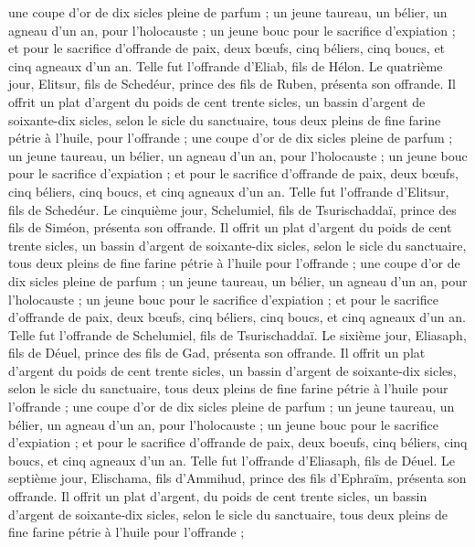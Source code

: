 \begin{multicols}{2}
une coupe d'or de dix sicles pleine de parfum ;
un jeune taureau, un bélier, un agneau d'un an, pour l'holocauste ;
un jeune bouc pour le sacrifice d'expiation ;
et pour le sacrifice d'offrande de paix, deux bœufs, cinq béliers, cinq boucs, et cinq agneaux d'un an. Telle fut l'offrande d'Eliab, fils de Hélon.
Le quatrième jour, Elitsur, fils de Schedéur, prince des fils de Ruben, présenta son offrande.
Il offrit un plat d'argent du poids de cent trente sicles, un bassin d'argent de soixante-dix sicles, selon le sicle du sanctuaire, tous deux pleins de fine farine pétrie à l'huile, pour l'offrande ;
une coupe d'or de dix sicles pleine de parfum ;
un jeune taureau, un bélier, un agneau d'un an, pour l'holocauste ;
un jeune bouc pour le sacrifice d'expiation ;
et pour le sacrifice d'offrande de paix, deux bœufs, cinq béliers, cinq boucs, et cinq agneaux d'un an. Telle fut l'offrande d'Elitsur, fils de Schedéur.
Le cinquième jour, Schelumiel, fils de Tsurischaddaï, prince des fils de Siméon, présenta son offrande.
Il offrit un plat d'argent du poids de cent trente sicles, un bassin d'argent de soixante-dix sicles, selon le sicle du sanctuaire, tous deux pleins de fine farine pétrie à l'huile pour l'offrande ;
une coupe d'or de dix sicles pleine de parfum ;
un jeune taureau, un bélier, un agneau d'un an, pour l'holocauste ;
un jeune bouc pour le sacrifice d'expiation ;
et pour le sacrifice d'offrande de paix, deux bœufs, cinq béliers, cinq boucs, et cinq agneaux d'un an. Telle fut l'offrande de Schelumiel, fils de Tsurischaddaï.
Le sixième jour, Eliasaph, fils de Déuel, prince des fils de Gad, présenta son offrande.
Il offrit un plat d'argent du poids de cent trente sicles, un bassin d'argent de soixante-dix sicles, selon le sicle du sanctuaire, tous deux pleins de fine farine pétrie à l'huile pour l'offrande ;
une coupe d'or de dix sicles pleine de parfum ;
un jeune taureau, un bélier, un agneau d'un an, pour l'holocauste ;
un jeune bouc pour le sacrifice d'expiation ;
et pour le sacrifice d'offrande de paix, deux boeufs, cinq béliers, cinq boucs, et cinq agneaux d'un an. Telle fut l'offrande d'Eliasaph, fils de Déuel.
Le septième jour, Elischama, fils d'Ammihud, prince des fils d'Ephraïm, présenta son offrande.
Il offrit un plat d'argent, du poids de cent trente sicles, un bassin d'argent de soixante-dix sicles, selon le sicle du sanctuaire, tous deux pleins de fine farine pétrie à l'huile pour l'offrande ;

\end{multicols}
